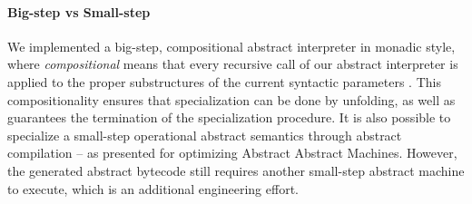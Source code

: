 \paragraph{Big-step vs Small-step}

We implemented a big-step, compositional abstract interpreter in monadic
style, where \textit{compositional} means that every recursive call of our abstract
interpreter is applied to the proper substructures of the current syntactic
parameters \cite{10.1007/3-540-61580-6_11}. This compositionality ensures that
specialization can be done by unfolding, as well as guarantees the termination
of the specialization procedure. It is also possible to specialize a small-step
operational abstract semantics through abstract compilation
\cite{Boucher:1996:ACN:647473.727587} -- as
\citet{Johnson:2013:OAA:2500365.2500604} presented for
optimizing Abstract Abstract Machines. However, the generated abstract
bytecode still requires another small-step abstract machine to execute, which is
an additional engineering effort.
